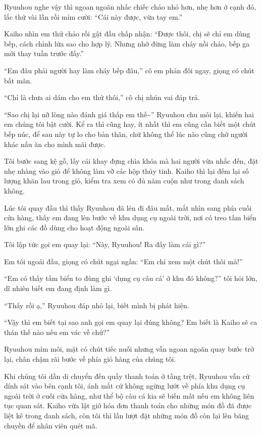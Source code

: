 ﻿\documentclass[../main.tex]{subfiles}
\begin{document}
Ryuuhou nghe vậy thì ngoan ngoãn nhấc chiếc chảo nhỏ hơn, nhẹ hơn ở cạnh đó, lắc thử vài lần rồi mỉm cười: ``Cái này được, vừa tay em.''

Kaiho nhìn em thử chảo rồi gật đầu chấp nhận: ``Được thôi, chị sẽ chỉ em dùng bếp, cách chỉnh lửa sao cho hợp lý. Nhưng nhớ đừng làm cháy nồi chảo, bếp ga mới thay tuần trước đấy.''

``Em đâu phải người hay làm cháy bếp đâu,'' cô em phản đối ngay, giọng có chút bất mãn.

``Chỉ là chưa ai dám cho em thử thôi,'' cô chị nhún vai đáp trả.

``Sao chị lại nỡ lòng nào đánh giá thấp em thế\~{}'' Ryuuhou chu môi lại, khiến hai em chúng tôi bật cười. Kể ra thì cũng hay, ít nhất thì em cũng cần biết một chút bếp núc, để sau này tự lo cho bản thân, chứ không thể lúc nào cũng chờ người khác nấu ăn cho mình mãi được.

Tôi bước sang kệ gỗ, lấy cái khay đựng chìa khóa mà hai người vừa nhắc đến, đặt nhẹ nhàng vào giỏ để không làm vỡ các hộp thủy tinh. Kaiho thì lại đếm lại số lượng khăn lau trong giỏ, kiểm tra xem có đủ năm cuộn như trong danh sách không.

Lúc tôi quay đầu thì thấy Ryuuhou đã lẻn đi đâu mất, mắt nhìn sang phía cuối cửa hàng, thấy em đang lẻn bước về khu dụng cụ ngoài trời, nơi có treo tấm biển lớn ghi các đồ dùng cho hoạt động ngoài sân.

Tôi lập tức gọi em quay lại: ``Này, Ryuuhou! Ra đấy làm cái gì?''

Em tôi ngoái đầu, giọng có chút ngại ngần: ``Em chỉ xem một chút thôi mà!''

``Em có thấy tấm biển to đùng ghi `dụng cụ câu cá' ở khu đó không?'' tôi hỏi lớn, dĩ nhiên biết em đang định làm gì.

``Thấy rồi ạ,'' Ryuuhou đáp nhỏ lại, biết mình bị phát hiện.

``Vậy thì em biết tại sao anh gọi em quay lại đúng không? Em biết là Kaiho sẽ ca thán thế nào nếu em vác về chứ?''

Ryuuhou mím môi, mặt có chút tiếc nuối nhưng vẫn ngoan ngoãn quay bước trở lại, chân chậm rãi bước về phía giỏ hàng của chúng tôi.

\ct

Khi chúng tôi dần di chuyển đến quầy thanh toán ở tầng trệt, Ryuuhou vẫn cứ dính sát vào bên cạnh tôi, ánh mắt cứ không ngừng lướt về phía khu dụng cụ ngoài trời ở cuối cửa hàng, như thể bộ câu cá kia sẽ biến mất nếu em không liên tục quan sát. Kaiho vừa lật giở hóa đơn thanh toán cho những món đồ đã được liệt kê trong danh sách, còn tôi thì lần lượt đặt những món đồ còn lại lên băng chuyền để nhân viên quét mã.
\end{document}

